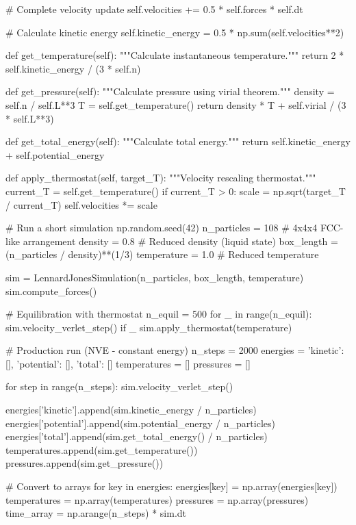 \documentclass[11pt,a4paper]{article}
\begin{document}
\begin{pycode}
        # Complete velocity update
        self.velocities += 0.5 * self.forces * self.dt

        # Calculate kinetic energy
        self.kinetic_energy = 0.5 * np.sum(self.velocities**2)

    def get_temperature(self):
        """Calculate instantaneous temperature."""
        return 2 * self.kinetic_energy / (3 * self.n)

    def get_pressure(self):
        """Calculate pressure using virial theorem."""
        density = self.n / self.L**3
        T = self.get_temperature()
        return density * T + self.virial / (3 * self.L**3)

    def get_total_energy(self):
        """Calculate total energy."""
        return self.kinetic_energy + self.potential_energy

    def apply_thermostat(self, target_T):
        """Velocity rescaling thermostat."""
        current_T = self.get_temperature()
        if current_T > 0:
            scale = np.sqrt(target_T / current_T)
            self.velocities *= scale

# Run a short simulation
np.random.seed(42)
n_particles = 108  # 4x4x4 FCC-like arrangement
density = 0.8  # Reduced density (liquid state)
box_length = (n_particles / density)**(1/3)
temperature = 1.0  # Reduced temperature

sim = LennardJonesSimulation(n_particles, box_length, temperature)
sim.compute_forces()

# Equilibration with thermostat
n_equil = 500
for _ in range(n_equil):
    sim.velocity_verlet_step()
    if _ %
        sim.apply_thermostat(temperature)

# Production run (NVE - constant energy)
n_steps = 2000
energies = {'kinetic': [], 'potential': [], 'total': []}
temperatures = []
pressures = []

for step in range(n_steps):
    sim.velocity_verlet_step()

    energies['kinetic'].append(sim.kinetic_energy / n_particles)
    energies['potential'].append(sim.potential_energy / n_particles)
    energies['total'].append(sim.get_total_energy() / n_particles)
    temperatures.append(sim.get_temperature())
    pressures.append(sim.get_pressure())

# Convert to arrays
for key in energies:
    energies[key] = np.array(energies[key])
temperatures = np.array(temperatures)
pressures = np.array(pressures)
time_array = np.arange(n_steps) * sim.dt
\end{pycode}
\end{document}
